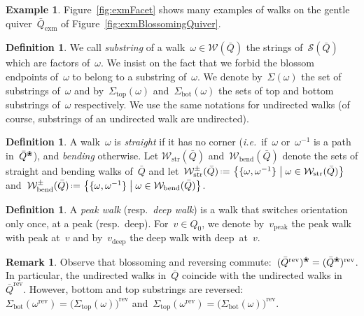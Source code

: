 \documentclass{amsart}
\theoremstyle{definition}
\newtheorem{definition}[theorem]{Definition}
\newtheorem{example}[theorem]{Example}
\newtheorem{remark}[theorem]{Remark}
\newcommand{\set}[2]{\left\{ #1 \;\middle|\; #2 \right\}} %
\newcommand{\eqdef}{\mbox{\,\raisebox{0.2ex}{\scriptsize\ensuremath{\mathrm:}}\ensuremath{=}\,}} %
\newcommand{\fref}[1]{Figure~\ref{#1}} %
\newcommand{\ie}{\textit{i.e.}~} %
\newcommand{\darkblue}{\color{darkblue}} %
\newcommand{\defn}[1]{\textsl{\darkblue #1}} %
\newcommand{\ex}{_{\textrm{exm}}} %
\newcommand{\blossom}{^\text{\ding{96}}} %
\newcommand{\strings}{\mathcal{S}} %
\newcommand{\walks}{\mathcal{W}} %
\newcommand{\straightWalks}{\mathcal{W}_\mathrm{str}} %
\newcommand{\bendingWalks}{\mathcal{W}_\mathrm{bend}} %
\newcommand{\peak}{\mathrm{peak}} %
\newcommand{\deep}{\mathrm{deep}} %
\newcommand{\reversed}[1]{#1^{\mathrm{rev}}} %
\renewcommand{\top}{\mathrm{top}} %
\newcommand{\bottom}{\mathrm{bot}} %
\begin{document}
\begin{example}
\fref{fig:exmFacet} shows many examples of walks on the gentle quiver~$\bar Q\ex$ of \fref{fig:exmBlossomingQuiver}.
\end{example}

\begin{definition}
\label{def:substrings}
We call \defn{substring} of a walk~$\omega \in \walks(\bar Q)$ the strings of~$\strings(\bar Q)$ which are factors of~$\omega$.
We insist on the fact that we forbid the blossom endpoints of~$\omega$ to belong to a substring of~$\omega$.
We denote by~$\Sigma(\omega)$ the set of substrings of~$\omega$ and by~$\Sigma_\top(\omega)$ and~$\Sigma_\bottom(\omega)$ the sets of top and bottom substrings of~$\omega$ respectively.
We use the same notations for undirected walks (of course, substrings of an undirected walk are undirected).
\end{definition}

\begin{definition}
\label{def:straightBended}
A walk~$\omega$ is \defn{straight} if it has no corner (\ie if~$\omega$ or~$\omega^{-1}$ is a path in~$\bar Q\blossom$), and \defn{bending} otherwise. Let $\straightWalks(\bar Q)$ and~$\bendingWalks(\bar Q)$ denote the sets of straight and bending walks of~$\bar Q$ and let~$\straightWalks^\pm(\bar Q) \eqdef \set{\{\omega, \omega^{-1}\}}{\omega \in \straightWalks(\bar Q)}$ and~$\bendingWalks^\pm(\bar Q) \eqdef \set{\{\omega, \omega^{-1}\}}{\omega \in \bendingWalks(\bar Q)}$.
\end{definition}

\begin{definition}
\label{def: deep walk}
A \defn{peak walk} (resp.~\defn{deep walk}) is a walk that switches orientation only once, at a peak (resp.~deep). For~$v \in Q_0$, we denote by~$v_\peak$ the peak walk with peak at~$v$ and by~$v_\deep$ the deep walk with deep~at~$v$.
\end{definition}

\begin{remark}
\label{rem:reverseBlossomingQuiver}
Observe that blossoming and reversing commute:~$(\reversed{\bar Q})\blossom = \reversed{(\bar Q\blossom)}$.
In particular, the undirected walks in~$\bar Q$ coincide with the undirected walks in~$\reversed{\bar Q}$.
However, bottom and top substrings are reversed: $\Sigma_\bottom(\reversed{\omega}) = \reversed{\big( \Sigma_\top(\omega) \big)}$ and~$\Sigma_\top(\reversed{\omega}) = \reversed{\big( \Sigma_\bottom(\omega) \big)}$.
\end{remark}
\end{document}
